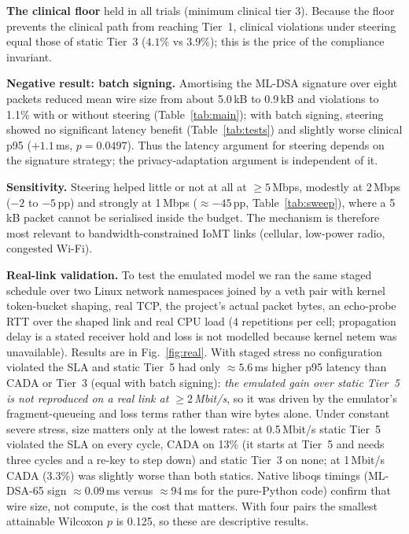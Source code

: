 \documentclass[10pt,twocolumn]{article}
\begin{document}
\textbf{The clinical floor} held in all trials (minimum clinical tier 3). Because the floor prevents the clinical path from reaching Tier~1, clinical violations under steering equal those of static Tier~3 ($4.1\%$ vs $3.9\%$); this is the price of the compliance invariant.

\textbf{Negative result: batch signing.} Amortising the ML-DSA signature over eight packets reduced mean wire size from about 5.0\,kB to 0.9\,kB and violations to 1.1\% with or without steering (Table~\ref{tab:main}); with batch signing, steering showed no significant latency benefit (Table~\ref{tab:tests}) and slightly worse clinical p95 ($+1.1$\,ms, $p=0.0497$). Thus the latency argument for steering depends on the signature strategy; the privacy-adaptation argument is independent of it.

\textbf{Sensitivity.} Steering helped little or not at all at $\ge5$\,Mbps, modestly at 2\,Mbps ($-2$ to $-5$\,pp) and strongly at 1\,Mbps ($\approx-45$\,pp, Table~\ref{tab:sweep}), where a 5\,kB packet cannot be serialised inside the budget. The mechanism is therefore most relevant to bandwidth-constrained IoMT links (cellular, low-power radio, congested Wi-Fi).

\textbf{Real-link validation.} To test the emulated model we ran the same staged schedule over two Linux network namespaces joined by a veth pair with kernel token-bucket shaping, real TCP, the project's actual packet bytes, an echo-probe RTT over the shaped link and real CPU load (4 repetitions per cell; propagation delay is a stated receiver hold and loss is not modelled because kernel netem was unavailable). Results are in Fig.~\ref{fig:real}. With staged stress no configuration violated the SLA and static Tier~5 had only $\approx5.6$\,ms higher p95 latency than CADA or Tier~3 (equal with batch signing): \emph{the emulated gain over static Tier~5 is not reproduced on a real link at $\ge2$\,Mbit/s}, so it was driven by the emulator's fragment-queueing and loss terms rather than wire bytes alone. Under constant severe stress, size matters only at the lowest rates: at 0.5\,Mbit/s static Tier~5 violated the SLA on every cycle, CADA on 13\% (it starts at Tier~5 and needs three cycles and a re-key to step down) and static Tier~3 on none; at 1\,Mbit/s CADA (3.3\%) was slightly worse than both statics. Native liboqs timings (ML-DSA-65 sign $\approx0.09$\,ms versus $\approx94$\,ms for the pure-Python code) confirm that wire size, not compute, is the cost that matters. With four pairs the smallest attainable Wilcoxon $p$ is 0.125, so these are descriptive results.
\end{document}
